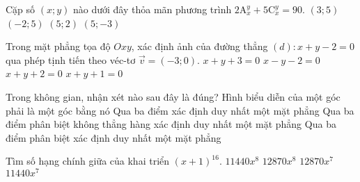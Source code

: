 \begin{ex}%
Cặp số $ (x;y) $ nào dưới đây thỏa mãn phương trình $ 2\mathrm{A}_x^y+5\mathrm{C}_x^y=90. $
\choice
{$ (3;5) $}
{$ (-2;5) $ }
{\True $ (5;2) $}
{$ (5;-3) $}
\end{ex}


\begin{ex}%
Trong mặt phẳng tọa độ $ Oxy $, xác định ảnh của đường thẳng $ (d)\colon x+y-2=0 $ qua phép tịnh tiến theo véc-tơ $ \vec{v}=(-3;0) $.
\choice
{$ x+y+3=0 $}
{$ x-y-2=0 $}
{$ x+y+2=0 $}
{\True $ x+y+1=0 $}
\end{ex}


\begin{ex}%
Trong không gian, nhận xét nào sau đây là đúng?
\choice
{Hình biểu diễn của một góc phải là một góc bằng nó}
{Qua ba điểm xác định duy nhất một mặt phẳng}
{\True Qua ba điểm phân biệt không thẳng hàng xác định duy nhất một mặt phẳng}
{Qua ba điểm phân biệt xác định duy nhất một mặt phẳng}
\end{ex}


\begin{ex}%
Tìm số hạng chính giữa của khai triển $ (x+1)^{16} $.
\choice
{$ 11440x^8 $}
{\True $ 12870x^8 $}
{$ 12870x^7 $}
{$ 11440x^7 $}
\end{ex}


